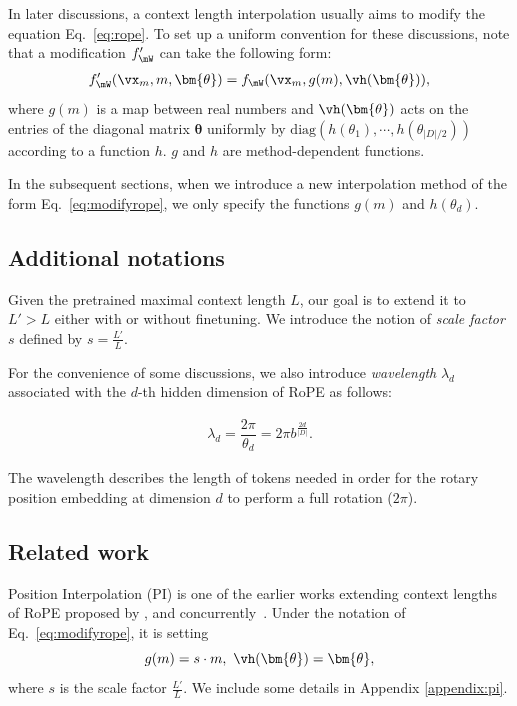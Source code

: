 \documentclass{article} %
\begin{document}
In later discussions, a context length interpolation usually aims to modify the equation Eq.~\ref{eq:rope}. To set up a uniform convention for these discussions, note that a modification $f'_{\mW}$ can take the following form:
\begin{align}\label{eq:modifyrope}
    f'_{\mW}(\vx_m, m, \bm{\theta}) = f_{\mW}(\vx_m, g(m), \vh(\bm{\theta})),
\end{align}
where $g(m)$ is a map between real numbers and $\vh(\bm{\theta})$ acts on the entries of the diagonal matrix $\bm{\theta}$ uniformly by $\text{diag}(h(\theta_1), \cdots, h(\theta_{|D|/2}))$ according to a function $h$. $g$ and $h$ are method-dependent functions. 

In the subsequent sections, when we introduce a new interpolation method of the form Eq.~\ref{eq:modifyrope}, we only specify the functions $g(m)$ and $h(\theta_d)$.

\subsection{Additional notations}\label{sec:related-work}
Given the pretrained maximal context length $L$, our goal is to extend it to $L' > L$ either with or without finetuning. We introduce the notion of {\it scale factor} $s$ defined by $s = \frac{L'}{L}$.

For the convenience of some discussions, we also introduce \emph{wavelength} $\lambda_d$ associated with the $d$-th hidden dimension of RoPE as follows: 

\begin{align} \label{eq:wavelength}
    \lambda_d = \dfrac{2\pi}{\theta_d} = 2\pi b^{\frac{2d}{|D|}}.
\end{align}

The wavelength describes the length of tokens needed in order for the rotary position embedding at dimension $d$ to perform a full rotation ($2\pi$).


\subsection{Related work}

Position Interpolation (PI) is one of the earlier works extending context lengths of RoPE proposed by \citet{chen2023extending}, and concurrently~\citet{kaiokendev}. Under the notation of Eq.~\ref{eq:modifyrope}, it is setting 
\begin{equation}
g(m) = s\cdot m, ~\vh(\bm{\theta}) = \bm{\theta},
\end{equation}
where $s$ is the scale factor $\frac{L'}{L}$. We include some details in Appendix \ref{appendix:pi}.
\end{document}
